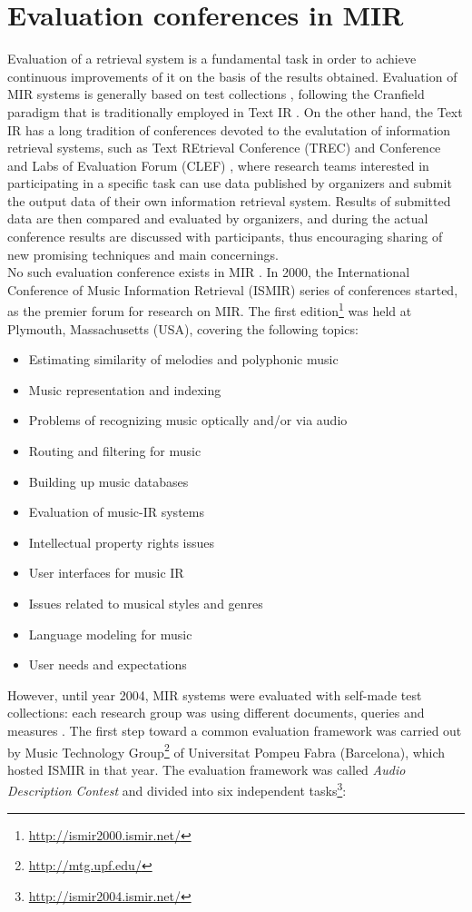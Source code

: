 \section{Evaluation conferences in MIR}
Evaluation of a retrieval system is a fundamental task in order to achieve continuous improvements of it on the basis of the results obtained. Evaluation of MIR systems is generally based on test collections \cite{sanderson10}, following the Cranfield paradigm that is traditionally employed in Text IR \cite{harman11} \cite{gomez14}. On the other hand, the Text IR has a long tradition of conferences devoted to the evalutation of information retrieval systems, such as Text REtrieval Conference (TREC) \cite{trec05} and Conference and Labs of Evaluation Forum (CLEF) \cite{clef00}, where research teams interested in participating in a specific task can use data published by organizers and submit the output data of their own information retrieval system. Results of submitted data are then compared and evaluated by organizers, and during the actual conference results are discussed with participants, thus encouraging sharing of new promising techniques and main concernings. \\
No such evaluation conference exists in MIR \cite{gomez14}. In 2000, the International Conference of Music Information Retrieval (ISMIR) series of conferences started, as the premier forum for research on MIR. The first edition\footnote{\url{http://ismir2000.ismir.net/}} was held at Plymouth, Massachusetts (USA), covering the following topics: 
\begin{itemize}
\item Estimating similarity of melodies and polyphonic music
\item Music representation and indexing
\item Problems of recognizing music optically and/or via audio
\item Routing and filtering for music
\item Building up music databases
\item Evaluation of music-IR systems
\item Intellectual property rights issues
\item User interfaces for music IR
\item Issues related to musical styles and genres
\item Language modeling for music
\item User needs and expectations
\end{itemize}
However, until year 2004, MIR systems were evaluated with self-made test collections: each research group was using different documents, queries and measures \cite{orio06}. The first step toward a common evaluation framework was carried out by Music Technology Group\footnote{\url{http://mtg.upf.edu/}} of Universitat Pompeu Fabra (Barcelona), which hosted ISMIR in that year. The evaluation framework was called \textit{Audio Description Contest} and divided into six independent tasks\footnote{\url{http://ismir2004.ismir.net/}}: 
